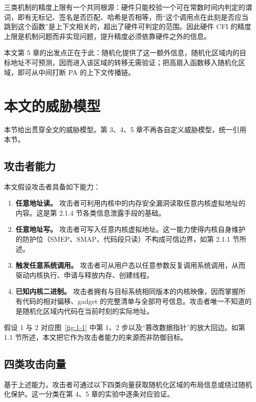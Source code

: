 三类机制的精度上限有一个共同根源：硬件只能校验一个可在常数时间内判定的谓词，即有无标记、签名是否匹配、哈希是否相等，而“这个调用点在此刻是否应当跳到这个函数”是上下文相关的，超出了硬件可判定的范围。因此硬件 CFI 的精度上限是机制问题而非实现问题，提升精度必须依靠硬件之外的信息。

本文第 5 章的出发点正在于此：随机化提供了这一额外信息，随机化区域内的目标地址不可预测，因而进入该区域的转移无需验证；把高扇入函数移入随机化区域，即可从中间打断 PA 的上下文传播链。

\section{本文的威胁模型}

本节给出贯穿全文的威胁模型。第 3、4、5 章不再各自定义威胁模型，统一引用本节。

\subsection{攻击者能力}

本文假设攻击者具备如下能力：

\begin{enumerate}
    \item \textbf{任意地址读。} 攻击者可利用内核中的内存安全漏洞读取任意内核虚拟地址的内容。这是第 2.1.4 节各类信息泄露手段的基础。
    \item \textbf{任意地址写。} 攻击者可写入任意内核虚拟地址。这一能力使得内核自身维护的防护位（SMEP、SMAP、代码段只读）不构成可信边界，如第 2.1.1 节所述。
    \item \textbf{触发任意系统调用。} 攻击者可从用户态以任意参数反复调用系统调用，从而驱动内核执行、申请与释放内存、创建线程。
    \item \textbf{已知内核二进制。} 攻击者拥有与目标系统相同版本的内核映像，因而掌握所有代码的相对偏移、gadget 的完整清单与全部符号信息。攻击者唯一不知道的是随机化区域内代码在当前时刻的实际地址。
\end{enumerate}

假设 1 与 2 对应图~\ref{fig:1-1} 中第 1、2 步以及“篡改数据指针”的放大回边。如第 1.1 节所述，本文把它作为攻击者能力的来源而非防御目标。

\subsection{四类攻击向量}

基于上述能力，攻击者可通过以下四类向量获取随机化区域的布局信息或绕过随机化保护。这一分类在第 4、5 章的实验中逐条对应验证。

